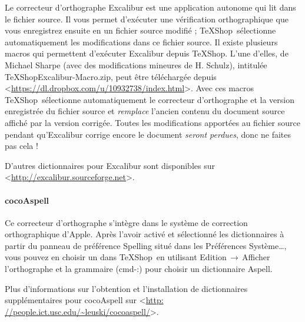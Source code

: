 \documentclass[11pt,french]{article}
\newcommand{\TS}{\textsf{\TeX Shop}}
\newcommand{\cmd}[1]{\textsf{#1}}
\newcommand{\mnu}[1]{\textsf{#1}}
\newcommand{\To}{\,\(\to\)\,}
\begin{document}
Le correcteur d'orthographe \cmd{Excalibur} est une application autonome qui lit dans le fichier source. Il vous permet d'exécuter une vérification orthographique que vous enregistrez ensuite en un fichier source modifié ; \TS\ sélectionne automatiquement les modifications dans ce fichier source. Il existe plusieurs macros qui permettent d'exécuter \cmd{Excalibur} depuis \TS. L'une d'elles, de Michael Sharpe (avec des modifications mineures de H. Schulz), intitulée \cmd{TeXShopExcalibur-Macro.zip}, peut être téléchargée depuis <\url{https://dl.dropbox.com/u/10932738/index.html}>. Avec ces macros \TS\ sélectionne automatiquement le correcteur d'orthographe et la version enregistrée du fichier source et \emph{remplace} l'ancien contenu du document source affiché par la version corrigée. Toutes les modifications apportées au fichier source pendant qu'\cmd{Excalibur} corrige encore le document \emph{seront perdues}, donc ne faites pas cela !

D'autres dictionnaires pour \cmd{Excalibur} sont disponibles sur <\url{http://excalibur.sourceforge.net}>.


\paragraph{\cmd{cocoAspell}}

%

Ce correcteur d'orthographe s'intègre dans le système de correction orthographique d'Apple. Après l'avoir activé et sélectionné les dictionnaires à partir du panneau de préférence \cmd{Spelling} situé dans les \cmd{Préférences Système…}, vous pouvez en choisir un dans \TS\ en utilisant \mnu{Edition}\To\mnu{Afficher l'orthographe et la grammaire} (\cmd{cmd-:}) pour choisir un dictionnaire \cmd{Aspell}.

Plus d'informations sur l'obtention et l'installation de dictionnaires supplémentaires pour \cmd{cocoAspell} sur <\url{http: //people.ict.usc.edu/~leuski/cocoaspell/}>.

\end{document}

